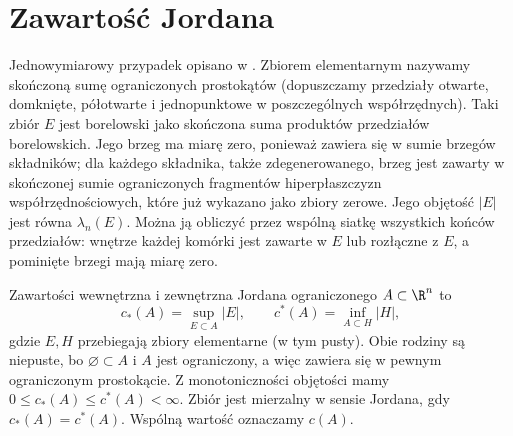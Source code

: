 \section{Zawartość Jordana}

Jednowymiarowy przypadek opisano w
.
Zbiorem elementarnym nazywamy skończoną sumę
ograniczonych prostokątów (dopuszczamy przedziały
otwarte, domknięte, półotwarte i jednopunktowe
w poszczególnych współrzędnych).
Taki zbiór $E$ jest borelowski jako skończona
suma produktów przedziałów borelowskich.
Jego brzeg ma miarę zero, ponieważ zawiera
się w sumie brzegów składników; dla każdego
składnika, także zdegenerowanego, brzeg
jest zawarty w skończonej sumie ograniczonych
fragmentów hiperpłaszczyzn współrzędnościowych,
które już wykazano jako zbiory zerowe. Jego objętość $|E|$ jest równa
$\lambda_n(E)$. Można ją obliczyć przez wspólną
siatkę wszystkich końców przedziałów: wnętrze
każdej komórki jest zawarte w $E$ lub rozłączne
z $E$, a pominięte brzegi mają miarę zero.

\begin{definicja}
\label{ma2:def:jordan-content}
Zawartości wewnętrzna i zewnętrzna Jordana
ograniczonego $A\subset\R^n$ to
\[
 c_*(A)=\sup_{E\subset A}|E|,\qquad
 c^*(A)=\inf_{A\subset H}|H|,
\]
gdzie $E,H$ przebiegają zbiory elementarne
(w tym pusty). Obie rodziny są niepuste,
bo $\varnothing\subset A$ i $A$ jest ograniczony,
a więc zawiera się w pewnym ograniczonym
prostokącie. Z monotoniczności objętości
mamy $0\le c_*(A)\le c^*(A)<\infty$.
Zbiór jest mierzalny w sensie
Jordana, gdy $c_*(A)=c^*(A)$. Wspólną wartość
oznaczamy $c(A)$.
\end{definicja}

